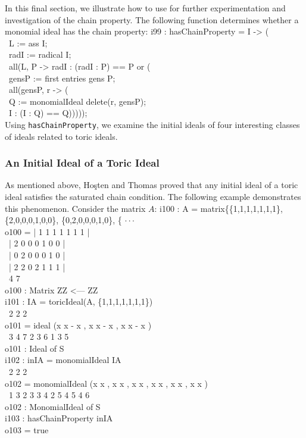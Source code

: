 In this final section, we illustrate how to use \Mtwo for further
experimentation and investigation of the chain property.  The
following function determines whether a monomial ideal has the chain
property:
\beginOutput
i99 : hasChainProperty = I -> (\\
\           L := ass I;\\
\           radI := radical I;\\
\           all(L, P -> radI : (radI : P) == P or (\\
\                     gensP := first entries gens P;\\
\                     all(gensP, r -> (\\
\                               Q := monomialIdeal delete(r, gensP);\\
\                               I : (I : Q) == Q)))));\\
\endOutput
Using {\tt hasChainProperty}, we examine the initial ideals of four
interesting classes of ideals related to toric ideals.

\subsubsection*{An Initial Ideal of a Toric Ideal}  As mentioned above, Ho\c{s}ten
and Thomas proved that any initial ideal of a toric ideal satisfies
the saturated chain condition.  The following example demonstrates this
phenomenon.  Consider the matrix $A$:
\beginOutput
i100 : A = matrix\{\{1,1,1,1,1,1,1\}, \{2,0,0,0,1,0,0\}, \{0,2,0,0,0,1,0\}, \{ $\cdot\cdot\cdot$\\
\emptyLine
o100 = | 1 1 1 1 1 1 1 |\\
\       | 2 0 0 0 1 0 0 |\\
\       | 0 2 0 0 0 1 0 |\\
\       | 2 2 0 2 1 1 1 |\\
\emptyLine
\                4        7\\
o100 : Matrix ZZ  <--- ZZ\\
\endOutput
\beginOutput
i101 : IA = toricIdeal(A, \{1,1,1,1,1,1,1\})\\
\emptyLine
\                      2          2          2\\
o101 = ideal (x x  - x , x x  - x , x x  - x )\\
\               3 4    7   2 3    6   1 3    5\\
\emptyLine
o101 : Ideal of S\\
\endOutput
\beginOutput
i102 : inIA = monomialIdeal IA\\
\emptyLine
\                                           2     2     2\\
o102 = monomialIdeal (x x , x x , x x , x x , x x , x x )\\
\                       1 3   2 3   3 4   2 5   4 5   4 6\\
\emptyLine
o102 : MonomialIdeal of S\\
\endOutput
\beginOutput
i103 : hasChainProperty inIA\\
\emptyLine
o103 = true\\
\endOutput

